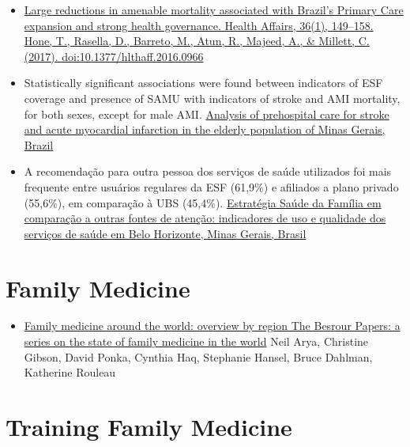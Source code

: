 \documentclass[]{book}
\providecommand{\tightlist}{%
  \setlength{\itemsep}{0pt}\setlength{\parskip}{0pt}}
\begin{document}
\begin{itemize}
\item
  \href{https://www.healthaffairs.org/doi/full/10.1377/hlthaff.2016.0966?url_ver=Z39.88-2003\&rfr_id=ori:rid:crossref.org\&rfr_dat=cr_pub\%3dpubmed}{Large reductions in amenable mortality associated with Brazil's Primary Care expansion and strong health governance. Health Affairs, 36(1), 149--158. Hone, T., Rasella, D., Barreto, M., Atun, R., Majeed, A., \& Millett, C. (2017). doi:10.1377/hlthaff.2016.0966}
\item
  Statistically significant associations were found between indicators of ESF coverage and presence of SAMU with indicators of stroke and AMI mortality, for both sexes, except for male AMI. \href{http://www.scielo.br/pdf/ramb/v56n4/en_19.pdf}{Analysis of prehospital care for stroke and acute myocardial infarction in the elderly population of Minas Gerais, Brazil}
\item
  A recomendação para outra pessoa dos serviços de saúde utilizados foi mais frequente entre usuários regulares da ESF (61,9\%) e afiliados a plano privado (55,6\%), em comparação à UBS (45,4\%). \href{http://www.scielo.br/scielo.php?script=sci_arttext\&pid=S0102-311X2013000700011\&lng=en\&nrm=iso\&tlng=en}{Estratégia Saúde da Família em comparação a outras fontes de atenção: indicadores de uso e qualidade dos serviços de saúde em Belo Horizonte, Minas Gerais, Brasil}
\end{itemize}

\hypertarget{family-medicine}{%
\section*{Family Medicine}\label{family-medicine}}

\begin{itemize}
\tightlist
\item
  \href{https://www.ncbi.nlm.nih.gov/pmc/articles/PMC5471080/pdf/0630436.pdf}{Family medicine around the world: overview by region The Besrour Papers: a series on the state of family medicine in the world} Neil Arya, Christine Gibson, David Ponka, Cynthia Haq, Stephanie Hansel, Bruce Dahlman, Katherine Rouleau
\end{itemize}

\hypertarget{training-family-medicine}{%
\section*{Training Family Medicine}\label{training-family-medicine}}
\end{document}
